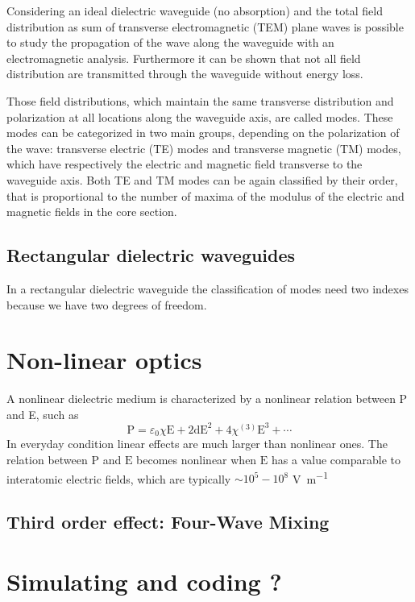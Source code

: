 \documentclass[12pt,a4paper]{article}
\begin{document}
Considering an ideal dielectric waveguide (no absorption) and the total field distribution as sum of transverse electromagnetic (TEM) plane waves is possible to study the propagation of the wave along the waveguide with an electromagnetic analysis.
Furthermore it can be shown that not all field distribution are transmitted through the waveguide without energy loss.

Those field distributions, which maintain the same transverse distribution and polarization at all locations along the waveguide axis, are called modes.
These modes can be categorized in two main groups, depending on the polarization of the wave: transverse electric (TE) modes and transverse magnetic (TM) modes, which have respectively the electric and magnetic field transverse to the waveguide axis.
Both TE and TM modes can be again classified by their order, that is proportional to the number of maxima of the modulus of the electric and magnetic fields in the core section.


\subsection{Rectangular dielectric waveguides}
In a rectangular dielectric waveguide the classification of modes need two indexes because we have two degrees of freedom.

\section{Non-linear optics}
A nonlinear dielectric medium is characterized by a nonlinear relation between P and E, such as
$$\mathrm{P} = \varepsilon_0\chi \mathrm{E} + 2\mathrm{d}\mathrm{E}^2 + 4\chi^{(3)}\mathrm{E}^3 + \cdots$$
In everyday condition linear effects are much larger than nonlinear ones.
The relation between $\mathrm{P}$ and $\mathrm{E}$ becomes nonlinear when $\mathrm{E}$ has a value comparable to interatomic electric fields, which are typically $\sim 10^5-10^8$ \si{\V\per\m}
\subsection{Third order effect: Four-Wave Mixing}

\section{Simulating and coding ?}
\end{document}
